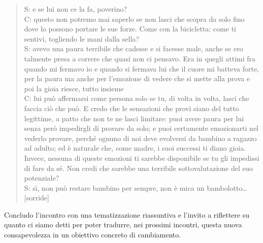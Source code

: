 \begin{verse}
S: e se lui non ce la fa, poverino?\\
C: questo non potremo mai saperlo se non lasci che scopra da solo fino dove lo possono portare le sue forze. Come con la bicicletta: come ti sentivi, togliendo le mani dalla sella?\\
S: avevo una paura terribile che cadesse e si facesse male, anche se ero talmente presa a correre che quasi non ci pensavo. Era in quegli attimi fra quando mi fermavo io e quando si fermava lui che il cuore mi batteva forte, per la paura ma anche per l'emozione di vedere che si mette alla prova e poi la gioia riesce, tutto insieme\\
C: lui può affermarsi come persona solo se tu, di volta in volta, lasci che faccia ciò che può. E credo che le sensazioni che provi siano del tutto legittime, a patto che non te ne lasci limitare: puoi avere paura per lui senza però impedirgli di provare da solo; e puoi certamente emozionarti  nel vederlo provare, perché ognuno di noi deve evolversi da bambino a ragazzo ad adulto; ed è naturale che, come madre, i suoi successi ti diano gioia. Invece, nessuna di queste emozioni ti sarebbe disponibile se tu gli impedissi di fare da sé. Non credi che sarebbe una terribile sottovalutazione del suo potenziale?\\
S: sì, non può restare bambino per sempre, non è mica un bambolotto\ldots{}   [sorride]\\
\end{verse}

Concludo l'incontro con una tematizzazione riassuntiva e l'invito a riflettere su quanto ci siamo detti per poter tradurre, nei prossimi incontri, questa nuova consapevolezza in un obiettivo concreto di cambiamento.